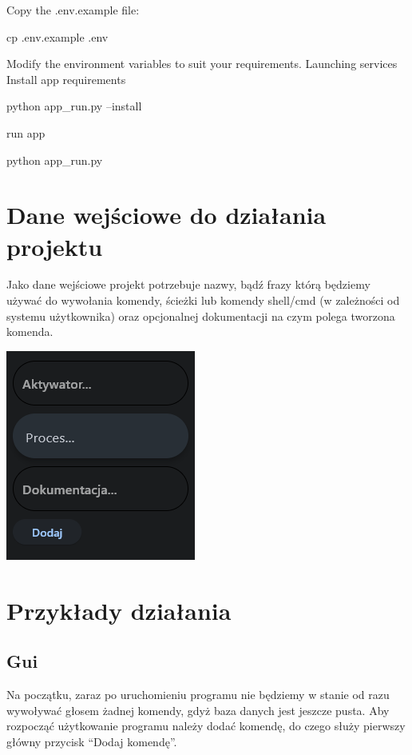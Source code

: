 \documentclass[polish]{article}
\begin{document}
			Copy the .env.example file:
			 
		\begin{CPP}
			cp .env.example .env
		\end{CPP}
		
		Modify the environment variables to suit your requirements.
		Launching services
		Install app requirements
		
		\begin{CPP}
			python app_run.py --install
		\end{CPP}
		
		run app
		
		\begin{CPP}
			python app_run.py
		\end{CPP}
		

    \section{Dane wejściowe do działania projektu}

        Jako dane wejściowe projekt potrzebuje nazwy, bądź frazy którą będziemy używać do wywołania komendy, ścieżki lub komendy shell/cmd (w zależności od systemu użytkownika) oraz opcjonalnej dokumentacji na czym polega tworzona komenda.

        \begin{center}

          \includegraphics[scale=0.6]{screen3.png}

        \end{center}

    \section{Przykłady działania}

		\subsection{Gui}
        Na początku, zaraz po uruchomieniu programu nie będziemy w stanie od razu wywoływać głosem żadnej komendy, gdyż baza danych jest jeszcze pusta. Aby rozpocząć użytkowanie programu należy dodać komendę, do czego służy pierwszy główny przycisk ``Dodaj komendę''.
\end{document}
